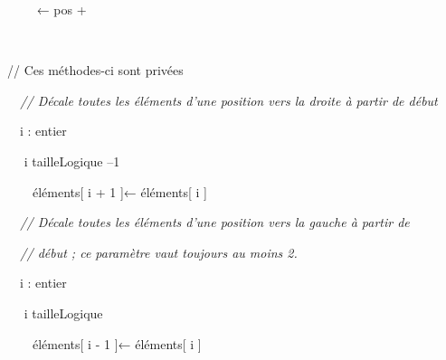 {\sffamily
\ \ \ \ \textrm{ }← pos +
}

{\sffamily
\textstyleWWPolicepardfaut{\ \ }\textstyleWWPolicepardfaut{
}\textstyleWWPolicepardfaut{
}\textstyleWWPolicepardfaut{~}}

{\sffamily
\ \  \textstyleWWPolicepardfaut{${\leq}$}}

{\sffamily
{} }


\bigskip

{\sffamily
// Ces méthodes-ci sont privées}


\bigskip

{\sffamily
{} }

{\sffamily\itshape
\ \ // Décale toutes les éléments d'une position vers
la droite à partir de début}

{\sffamily
\ \ i : entier}

{\sffamily
\ \  i  tailleLogique
 –1
 }

{\sffamily
\ \ \ \ éléments[ i + 1 ]\textstyleWWPolicepardfaut{~}← éléments[ i
]\textstyleWWPolicepardfaut{~}}

{\sffamily
\textstyleWWPolicepardfaut{\ \ }\textstyleWWPolicepardfaut{
}}

{\sffamily
{} }


\bigskip

{\sffamily
{} }

{\sffamily\itshape
\ \ // Décale toutes les éléments d'une position vers
la gauche à partir de}

{\sffamily\itshape
\ \ // début ; ce paramètre vaut toujours au moins 2.}

{\sffamily
\ \ i : entier}

{\sffamily
\ \  i 
 tailleLogique
 }

{\sffamily
\ \ \ \ éléments[ i - 1 ]\textstyleWWPolicepardfaut{~}← éléments[ i
]\textstyleWWPolicepardfaut{~}}

